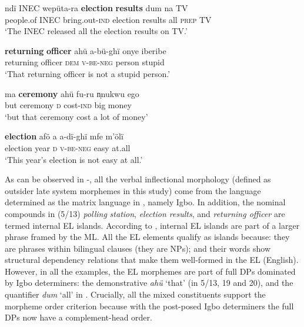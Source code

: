 \documentclass[output=paper]{langsci/langscibook}
\begin{document}
\ea\label{ex:ihemere:18}
\gll ndï    INEC  wepüta-ra  \textbf{election} \textbf{results}   dum  na  TV\\
     people.of  INEC  bring.out-\textsc{ind}   election results  all  \textsc{prep}  TV\\
\glt ‘The INEC released all the election results on TV.’    
\z

\ea\label{ex:ihemere:19}
\gll \textbf{returning} \textbf{officer}  ahü       a-bü-ghï        onye    iberibe\\
     returning officer     \textsc{dem}  \textsc{v-be-neg}  person  stupid\\
\glt ‘That returning officer is not a stupid person.’
\z

\ea\label{ex:ihemere:20}
\gll ma  \textbf{ceremony}   ahü  fu-ru      n̩nukwu   ego\\
     but ceremony  \textsc{d}  cost-\textsc{ind}  big    money\\
\glt ‘but that ceremony cost a lot of money’
\z

\ea\label{ex:ihemere:21}
\gll \textbf{election}  afö  a  a-dï-ghï  mfe  m’ölï\\
     election    year  \textsc{d}  \textsc{v-be-neg}  easy  at.all\\
\glt ‘This year’s election is not easy at all.’
\z

As can be observed in -, all the verbal inflectional morphology (defined as outsider late system morphemes in this study) come from the language determined as the matrix language in , namely Igbo. In addition, the nominal compounds in (5/13) \textit{polling}\textbf{\textit{}} \textit{station},  \textit{election results}, and  \textit{returning officer} are termed internal EL islands. According to \citet[265]{MyersScotton2006}, internal EL islands are part of a larger phrase framed by the ML. All the EL elements qualify as islands because: they are phrases within bilingual clauses (they are NPs); and their words show structural dependency relations that make them well-formed in the EL (English). However, in all the examples, the EL morphemes are part of full DPs dominated by Igbo determiners: the demonstrative \textit{ahü} ‘that’ (in 5/13, 19 and 20), and the quantifier \textit{dum} ‘all’ in . Crucially, all the mixed constituents support the morpheme order criterion because with the post-posed Igbo determiners the full DPs now have a complement-head order. 
\end{document}
